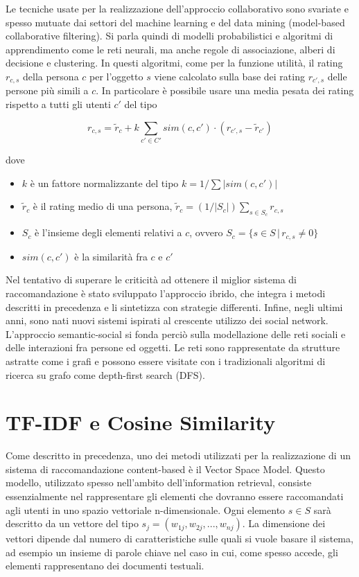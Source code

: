 \documentclass[Lau,binding=0.6cm,noexaminfo,oneside]{sapthesis}
\begin{document}
Le tecniche usate per la realizzazione dell'approccio collaborativo sono svariate e spesso mutuate dai settori del machine learning e del data mining (model-based collaborative filtering). Si parla quindi di modelli probabilistici e algoritmi di apprendimento come le reti neurali, ma anche regole di associazione, alberi di decisione e clustering.
In questi algoritmi, come per la funzione utilità, il rating $r_{c,s}$ della persona $c$ per l'oggetto $s$ viene calcolato sulla base dei rating $r_{c',s}$ delle persone più simili a $c$. In particolare è possibile usare una media pesata dei rating rispetto a tutti gli utenti $c'$ del tipo

\[
r_{c,s} = \widetilde{r}_c + k \sum_{c' \in C'} sim(c,c') \cdot (r_{c',s} - \widetilde{r}_{c'})
\]

dove

\begin{itemize}
  \item $k$ è un fattore normalizzante del tipo $k = 1 / \sum |sim(c,c')|$
  \item $\widetilde{r}_c$ è il rating medio di una persona, $\widetilde{r}_c = (1/|S_c|) \sum_{s \in S_c} r_{c,s}$
  \item $S_c$ è l'insieme degli elementi relativi a $c$, ovvero $S_c = \{s \in S \, | \, r_{c,s} \neq 0\}$
  \item $sim(c,c')$ è la similarità fra $c$ e $c'$
\end{itemize}

\medskip

Nel tentativo di superare le criticità ad ottenere il miglior sistema di raccomandazione è stato sviluppato l'approccio ibrido, che integra i metodi descritti in precedenza e li sintetizza con strategie differenti. Infine, negli ultimi anni, sono nati nuovi sistemi ispirati al crescente utilizzo dei social network.
L'approccio semantic-social si fonda perciò sulla modellazione delle reti sociali e delle interazioni fra persone ed oggetti. Le reti sono rappresentate da strutture astratte come i grafi e possono essere visitate con i tradizionali algoritmi di ricerca su grafo come depth-first search (DFS).\medskip

\clearpage

\section{TF-IDF e Cosine Similarity}

Come descritto in precedenza, uno dei metodi utilizzati per la realizzazione di un sistema di raccomandazione content-based è il Vector Space Model. Questo modello,  utilizzato spesso nell'ambito dell'information retrieval, consiste essenzialmente nel rappresentare gli elementi che dovranno essere raccomandati agli utenti in uno spazio vettoriale n-dimensionale.
Ogni elemento $s \in S$ sarà descritto da un vettore del tipo $s_j = (w_{1j}, w_{2j}, ..., w_{nj})$. La dimensione dei vettori dipende dal numero di caratteristiche sulle quali si vuole basare il sistema, ad esempio un insieme di parole chiave nel caso in cui, come spesso accede, gli elementi rappresentano dei documenti testuali.\medskip
\end{document}
